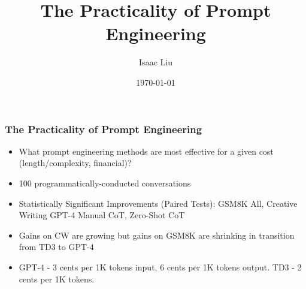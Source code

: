 \documentclass{beamer}
\title[The Practicality of Prompt Engineering]{The Practicality of Prompt Engineering}
\author{Isaac Liu}
\date{\today}
\begin{document}
    \begin{frame}
        \frametitle{The Practicality of Prompt Engineering}
        \begin{itemize}
            \item What prompt engineering methods are most effective for a given cost (length/complexity, financial)?
            \item 100 programmatically-conducted conversations
            \item Statistically Significant Improvements (Paired Tests): GSM8K All, Creative Writing GPT-4 Manual CoT, Zero-Shot CoT
            \item Gains on CW are growing but gains on GSM8K are shrinking in transition from TD3 to GPT-4 %
            \item GPT-4 - 3 cents per 1K tokens input, 6 cents per 1K tokens output. TD3 - 2 cents per 1K tokens.
        \end{itemize}


        \begin{figure}[h]


\end{figure}
\end{frame}
\end{document}
